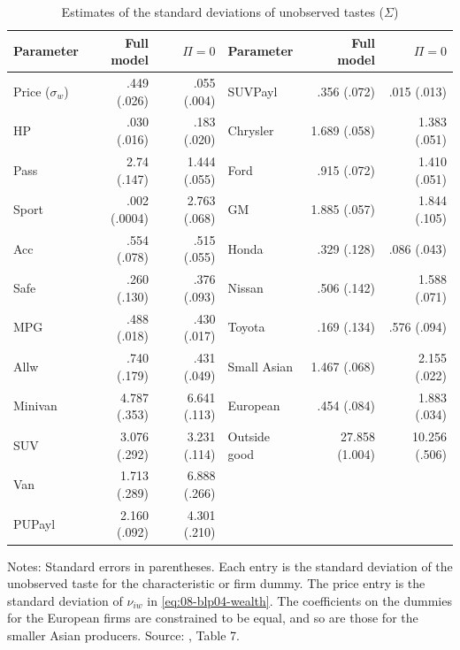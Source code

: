 \begin{table}[htbp]
\centering
\caption{Estimates of the standard deviations of unobserved tastes ($\Sigma$)}
\label{tab:08-blp04-sigma}
\footnotesize
\begin{tabular}{@{}lrr@{\hspace{2.2em}}lrr@{}}
\toprule
Parameter & Full model & $\Pi = 0$ & Parameter & Full model & $\Pi = 0$ \\
\midrule
Price ($\sigma_w$) & .449 (.026) & .055 (.004) & SUVPayl & .356 (.072) & .015 (.013) \\
HP & .030 (.016) & .183 (.020) & Chrysler & 1.689 (.058) & 1.383 (.051) \\
Pass & 2.74 (.147) & 1.444 (.055) & Ford & .915 (.072) & 1.410 (.051) \\
Sport & .002 (.0004) & 2.763 (.068) & GM & 1.885 (.057) & 1.844 (.105) \\
Acc & .554 (.078) & .515 (.055) & Honda & .329 (.128) & .086 (.043) \\
Safe & .260 (.130) & .376 (.093) & Nissan & .506 (.142) & 1.588 (.071) \\
MPG & .488 (.018) & .430 (.017) & Toyota & .169 (.134) & .576 (.094) \\
Allw & .740 (.179) & .431 (.049) & Small Asian & 1.467 (.068) & 2.155 (.022) \\
Minivan & 4.787 (.353) & 6.641 (.113) & European & .454 (.084) & 1.883 (.034) \\
SUV & 3.076 (.292) & 3.231 (.114) & Outside good & 27.858 (1.004) & 10.256 (.506) \\
Van & 1.713 (.289) & 6.888 (.266) & & & \\
PUPayl & 2.160 (.092) & 4.301 (.210) & & & \\
\bottomrule
\end{tabular}

\smallskip
\begin{minipage}{0.92\linewidth}
\footnotesize Notes: Standard errors in parentheses. Each entry is the standard deviation of the unobserved
taste for the characteristic or firm dummy. The price entry is the standard deviation of $\nu_{iw}$ in
\cref{eq:08-blp04-wealth}. The coefficients on the dummies for the European firms are constrained to be equal,
and so are those for the smaller Asian producers. Source: \citet{BerryLevinsohnPakes2004}, Table 7.
\end{minipage}
\end{table}

